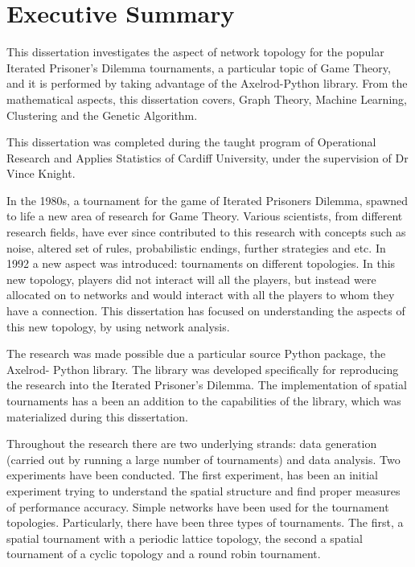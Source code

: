 \chapter{Executive Summary}
This dissertation investigates the aspect of network topology for the popular
Iterated Prisoner's Dilemma tournaments, a particular topic of  Game
Theory, and it is performed by taking advantage of the Axelrod-Python library.
From the mathematical aspects, this dissertation covers, Graph Theory,
Machine Learning, Clustering and the Genetic Algorithm.

This dissertation was completed during the taught program of Operational Research
and Applies Statistics of Cardiff University, under the supervision of Dr Vince
Knight.

In the 1980s, a tournament for the game of Iterated Prisoners Dilemma, spawned to
life a new area of research for Game Theory. Various scientists, from different
research fields, have ever since contributed to this research with concepts
such as noise, altered set of rules, probabilistic endings, further strategies and etc.
In 1992 a new aspect was introduced: tournaments on different topologies.
In this new topology, players did not interact will all the players, but instead
were allocated on to networks and would interact with all the players to whom they have a
connection. This dissertation has focused on understanding the aspects of
this new topology, by using network analysis.

The research was made possible due a particular source Python package, the
Axelrod- Python library. The library was developed specifically for
reproducing the research into the Iterated Prisoner's Dilemma. The implementation
of spatial tournaments has a been an addition to the capabilities of the library,
which was materialized during this dissertation. %

Throughout the research there are two underlying strands: data generation (carried
out by running a large number of tournaments) and data analysis.
Two experiments have been conducted. The first experiment, has been an initial
experiment trying to understand the spatial structure and find proper measures
of performance accuracy. Simple networks have been used for the tournament
topologies. Particularly, there have been three types of tournaments.
The first, a spatial tournament with a periodic lattice topology, the
second a spatial tournament of a cyclic topology and a round robin tournament.

